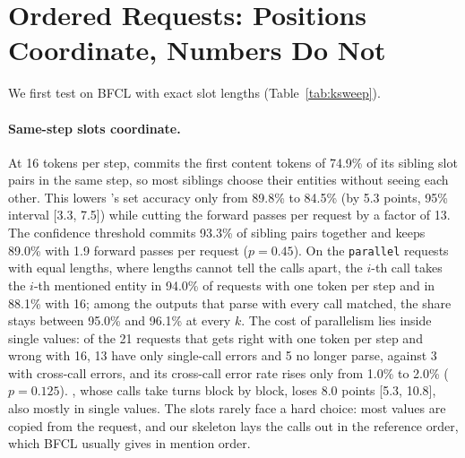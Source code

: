 \section{Ordered Requests: Positions Coordinate, Numbers Do Not}
\label{sec:ordered}




We first test  on BFCL with exact slot lengths (Table~\ref{tab:ksweep}).

\paragraph{Same-step slots coordinate.} At 16 tokens per step, \dream commits the first content tokens of 74.9\% of its sibling slot pairs in the same step, so most siblings choose their entities without seeing each other. This lowers \dream's set accuracy only from 89.8\% to 84.5\% (by 5.3 points, 95\% interval [3.3, 7.5]) while cutting the forward passes per request by a factor of 13. The confidence threshold commits 93.3\% of sibling pairs together and keeps 89.0\% with 1.9 forward passes per request ($p=0.45$). On the \texttt{parallel} requests with equal lengths, where lengths cannot tell the calls apart, the $i$-th call takes the $i$-th mentioned entity in 94.0\% of requests with one token per step and in 88.1\% with 16; among the outputs that parse with every call matched, the share stays between 95.0\% and 96.1\% at every $k$. The cost of parallelism lies inside single values: of the 21 requests that \dream gets right with one token per step and wrong with 16, 13 have only single-call errors and 5 no longer parse, against 3 with cross-call errors, and its cross-call error rate rises only from 1.0\% to 2.0\% ($p=0.125$). \llada, whose calls take turns block by block, loses 8.0 points [5.3, 10.8], also mostly in single values. The slots rarely face a hard choice: most values are copied from the request, and our skeleton lays the calls out in the reference order, which BFCL usually gives in mention order.

